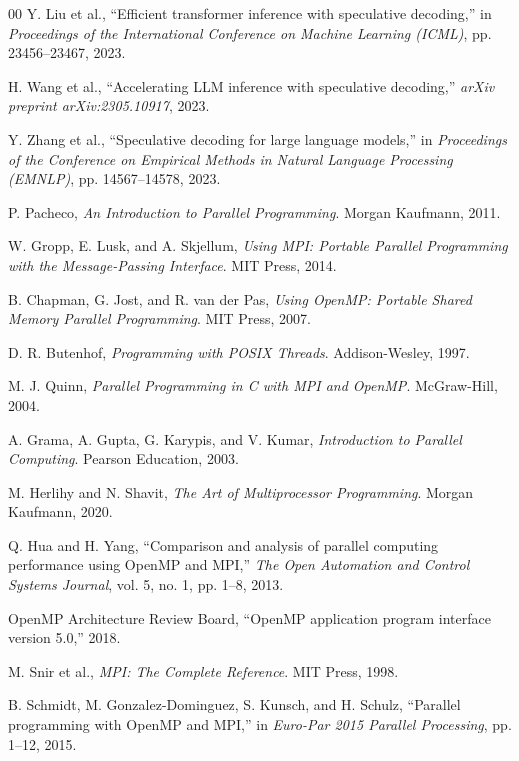 \documentclass[conference]{IEEEtran}
\begin{document}
\begin{thebibliography}{00}
Y. Liu et al., ``Efficient transformer inference with speculative decoding,'' in \textit{Proceedings of the International Conference on Machine Learning (ICML)}, pp. 23456--23467, 2023.

H. Wang et al., ``Accelerating LLM inference with speculative decoding,'' \textit{arXiv preprint arXiv:2305.10917}, 2023.

Y. Zhang et al., ``Speculative decoding for large language models,'' in \textit{Proceedings of the Conference on Empirical Methods in Natural Language Processing (EMNLP)}, pp. 14567--14578, 2023.

P. Pacheco, \textit{An Introduction to Parallel Programming}. Morgan Kaufmann, 2011.

W. Gropp, E. Lusk, and A. Skjellum, \textit{Using MPI: Portable Parallel Programming with the Message-Passing Interface}. MIT Press, 2014.

B. Chapman, G. Jost, and R. van der Pas, \textit{Using OpenMP: Portable Shared Memory Parallel Programming}. MIT Press, 2007.

D. R. Butenhof, \textit{Programming with POSIX Threads}. Addison-Wesley, 1997.

M. J. Quinn, \textit{Parallel Programming in C with MPI and OpenMP}. McGraw-Hill, 2004.

A. Grama, A. Gupta, G. Karypis, and V. Kumar, \textit{Introduction to Parallel Computing}. Pearson Education, 2003.

M. Herlihy and N. Shavit, \textit{The Art of Multiprocessor Programming}. Morgan Kaufmann, 2020.

Q. Hua and H. Yang, ``Comparison and analysis of parallel computing performance using OpenMP and MPI,'' \textit{The Open Automation and Control Systems Journal}, vol. 5, no. 1, pp. 1--8, 2013.

OpenMP Architecture Review Board, ``OpenMP application program interface version 5.0,'' 2018.

M. Snir et al., \textit{MPI: The Complete Reference}. MIT Press, 1998.

B. Schmidt, M. Gonzalez-Dominguez, S. Kunsch, and H. Schulz, ``Parallel programming with OpenMP and MPI,'' in \textit{Euro-Par 2015 Parallel Processing}, pp. 1--12, 2015.

\end{thebibliography}
\end{document}
